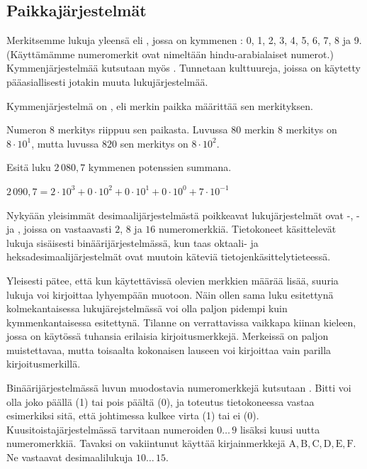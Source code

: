 \subsection*{Paikkajärjestelmät}

Merkitsemme lukuja yleensä  eli , jossa on kymmenen : 0, 1, 2, 3, 4, 5, 6, 7, 8 ja 9. (Käyttämämme numeromerkit ovat nimeltään hindu-arabialaiset numerot.) Kymmenjärjestelmää kutsutaan myös . Tunnetaan kulttuureja, joissa on käytetty pääasiallisesti jotakin muuta lukujärjestelmää.

Kymmenjärjestelmä on , eli merkin paikka määrittää sen merkityksen.

\begin{esimerkki}
Numeron 8 merkitys riippuu sen paikasta. Luvussa $80$ merkin 8 merkitys on $8 \cdot 10^1$, mutta luvussa $820$ sen merkitys on $8 \cdot 10^2$.
\end{esimerkki}
\begin{esimerkki}
Esitä luku $2\,080,7$ kymmenen potenssien summana.
	\begin{esimratk}
	$2\,090,7=2\cdot10^3+0\cdot10^2+0\cdot10^1+0\cdot10^0+7\cdot10^{-1}$
	\end{esimratk}
\end{esimerkki}

Nykyään yleisimmät desimaalijärjestelmästä poikkeavat lukujärjestelmät ovat -, - ja , joissa on vastaavasti $2$, $8$ ja $16$ numeromerkkiä. Tietokoneet käsittelevät lukuja sisäisesti binäärijärjestelmässä, kun taas oktaali- ja heksadesimaalijärjestelmät ovat muutoin käteviä tietojenkäsittelytieteessä.

Yleisesti pätee, että kun käytettävissä olevien merkkien määrää lisää, suuria lukuja voi kirjoittaa lyhyempään muotoon. Näin ollen sama luku esitettynä kolmekantaisessa lukujärejstelmässä voi olla paljon pidempi kuin kymmenkantaisessa esitettynä. Tilanne on verrattavissa vaikkapa kiinan kieleen, jossa on käytössä tuhansia erilaisia kirjoitusmerkkejä. Merkeissä on paljon muistettavaa, mutta toisaalta kokonaisen lauseen voi kirjoittaa vain parilla kirjoitusmerkillä.

Binäärijärjestelmässä luvun muodostavia numeromerkkejä kutsutaan . Bitti voi olla joko päällä (1) tai pois päältä (0), ja toteutus tietokoneessa vastaa esimerkiksi sitä, että johtimessa kulkee virta (1) tai ei (0). Kuusitoistajärjestelmässä tarvitaan numeroiden $0 \ldots \, 9$ lisäksi kuusi uutta numeromerkkiä. Tavaksi on vakiintunut käyttää kirjainmerkkejä $\mathrm{A, B, C, D, E, F}$. Ne vastaavat desimaalilukuja $10 \ldots \, 15$.

